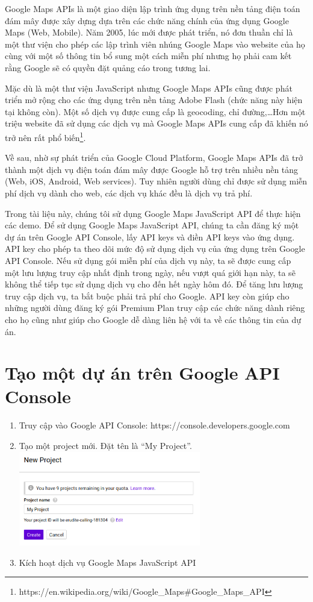 \documentclass[../thesis.tex]{subfiles}
\begin{document}
Google Maps APIs là một giao diện lập trình ứng dụng trên nền tảng điện toán đám mây được xây dựng dựa trên các chức năng chính của ứng dụng Google Maps (Web, Mobile). Năm 2005, lúc mới được phát triển, nó đơn thuần chỉ là một thư viện cho phép các lập trình viên nhúng Google Maps vào website của họ cùng với một số thông tin bổ sung một cách miễn phí nhưng họ phải cam kết rằng Google sẽ có quyền đặt quảng cáo trong tương lai.

Mặc dù là một thư viện JavaScript nhưng Google Maps APIs cũng được phát triển mở rộng cho các ứng dụng trên nền tảng Adobe Flash (chức năng này hiện tại không còn). Một số dịch vụ được cung cấp là geocoding, chỉ đường,\ldots Hơn một triệu website đã sử dụng các dịch vụ mà Google Maps APIs cung cấp đã khiến nó trở nên rất phổ biến\footnote{https://en.wikipedia.org/wiki/Google\_Maps\#Google\_Maps\_API}.

Về sau, nhờ sự phát triển của Google Cloud Platform, Google Maps APIs đã trở thành một dịch vụ điện toán đám mây được Google hỗ trợ trên nhiều nền tảng (Web, iOS, Android, Web services). Tuy nhiên người dùng chỉ được sử dụng miễn phí dịch vụ dành cho web, các dịch vụ khác đều là dịch vụ trả phí.

Trong tài liệu này, chúng tôi sử dụng Google Maps JavaScript API để thực hiện các demo. Để sử dụng Google Maps JavaScript API, chúng ta cần đăng ký một dự án trên Google API Console, lấy API keys và điền API keys vào ứng dụng. API key cho phép ta theo dõi mức độ sử dụng dịch vụ của ứng dụng trên Google API Console. Nếu sử dụng gói miễn phí của dịch vụ này, ta sẽ được cung cấp một lưu lượng truy cập nhất định trong ngày, nếu vượt quá giới hạn này, ta sẽ không thể tiếp tục sử dụng dịch vụ cho đến hết ngày hôm đó. Để tăng lưu lượng truy cập dịch vụ, ta bắt buộc phải trả phí cho Google. API key còn giúp cho những người dùng đăng ký gói Premium Plan truy cập các chức năng dành riêng cho họ cũng như giúp cho Google dễ dàng liên hệ với ta về các thông tin của dự án.

\section{Tạo một dự án trên Google API Console}

\begin{enumerate}
	\item Truy cập vào Google API Console: https://console.developers.google.com 
	\item Tạo một project mới. Đặt tên là ``My Project''.\\
	\includegraphics[width=300px, keepaspectratio]{../images/create_project.png}
	\item Kích hoạt dịch vụ Google Maps JavaScript API
\end{enumerate}
\end{document}
